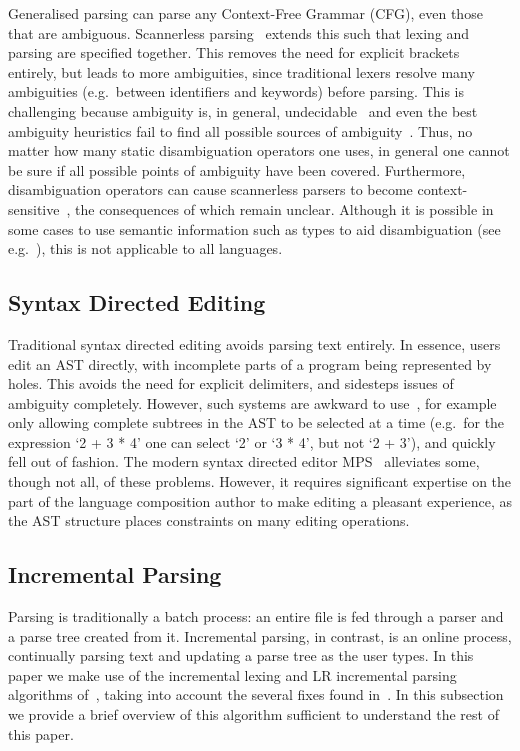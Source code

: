 \documentclass[sigplan,screen]{acmart}
\begin{document}
Generalised parsing can parse any Context-Free Grammar (CFG), even those that
are ambiguous. Scannerless parsing~\cite{visser97scannerless} extends this such
that lexing and parsing are specified together. This removes the need for
explicit brackets entirely, but leads to more ambiguities, since
traditional lexers resolve many ambiguities (e.g.~between identifiers and keywords)
before parsing. This is challenging because ambiguity is, in general,
undecidable~\cite{cantor62ambiguity} and even the best ambiguity heuristics fail
to find all possible sources of ambiguity~\cite{vasudevan13detecting}. Thus,
no matter how many static disambiguation operators one uses, in general one
cannot be sure if all possible points of ambiguity have been covered.
Furthermore, disambiguation operators can cause scannerless
parsers to become context-sensitive~\cite{eijck07accept}, the
consequences of which remain unclear. Although it is possible in some cases
to use semantic information such as types to aid disambiguation (see
e.g.~\cite{vinju05typedriven}), this is not applicable to all languages.


\subsection{Syntax Directed Editing}

Traditional syntax directed editing avoids parsing text entirely. In essence,
users edit an AST directly, with incomplete parts of a program being
represented by holes. This avoids the need for explicit delimiters, and
sidesteps issues of ambiguity completely. However, such systems are awkward to
use~\cite[p.~2]{khwaja93syntax}, for example only allowing complete subtrees in the
AST to be selected at a time (e.g.~for the expression `2 + 3 * 4' one can
select `2' or `3 * 4', but not `2 + 3'),
and quickly fell out of fashion. The modern syntax directed editor
MPS~\cite{pech13mps} alleviates some, though not all, of these problems.
However, it requires significant expertise on the part of the language composition
author to make editing a pleasant experience, as the AST structure places
constraints on many editing operations.


\subsection{Incremental Parsing}

Parsing is traditionally a batch process: an entire file is fed through a parser
and a parse tree created from it. Incremental parsing, in contrast,
is an online process, continually parsing text and updating a parse tree as the user types.
In this paper we make use of the incremental lexing and
LR incremental parsing algorithms of~\citet{wagner98practicalalgorithms},
taking into account the several fixes found in~\citet{diekmann18editing}.
In this subsection we provide a brief overview of this algorithm sufficient
to understand the rest of this paper.
\end{document}
